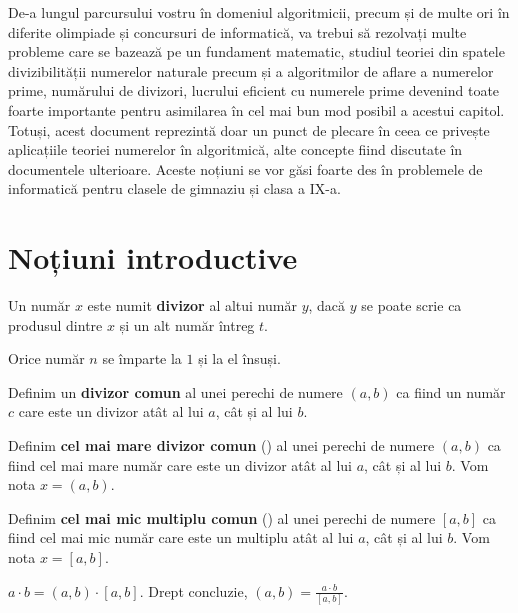 


De-a lungul parcursului vostru în domeniul algoritmicii, precum și de multe ori în diferite olimpiade și concursuri de informatică, va trebui să rezolvați multe probleme care se bazează pe un fundament matematic, studiul teoriei din spatele divizibilității numerelor naturale precum și a algoritmilor de aflare a numerelor prime, numărului de divizori, lucrului eficient cu numerele prime devenind toate foarte importante pentru asimilarea în cel mai bun mod posibil a acestui capitol. Totuși, acest document reprezintă doar un punct de plecare în ceea ce privește aplicațiile teoriei numerelor în algoritmică, alte concepte fiind discutate în documentele ulterioare. Aceste noțiuni se vor găsi foarte des în problemele de informatică pentru clasele de gimnaziu și clasa a IX-a.

\section{Noțiuni introductive}

\begin{definition}
Un număr $x$ este numit \textbf{divizor} al altui număr $y$, dacă $y$ se poate scrie ca produsul dintre $x$ și un alt număr întreg $t$.
\end{definition}

\begin{observation}
Orice număr $n$ se împarte la $1$ și la el însuși.
\end{observation}

\begin{definition}
    Definim un \textbf{divizor comun} al unei perechi de numere $(a, b)$ ca fiind un număr $c$ care este un divizor atât al lui $a$, cât și al lui $b$.
\end{definition}

\begin{definition}
    Definim \textbf{cel mai mare divizor comun} (\cmmdc) al unei perechi de numere $(a, b)$ ca fiind cel mai mare număr care este un divizor atât al lui $a$, cât și al lui $b$. Vom nota $x = (a, b)$.
\end{definition}
\begin{definition}
    Definim \textbf{cel mai mic multiplu comun} (\cmmmc) al unei perechi de numere $[a, b]$ ca fiind cel mai mic număr care este un multiplu atât al lui $a$, cât și al lui $b$. Vom nota $x = [a, b]$.
\end{definition}
\begin{observation}
    $a \cdot b = (a, b) \cdot [a, b]$. Drept concluzie, $(a, b) = \frac{a \cdot b}{[a, b]}$. 
\end{observation}

